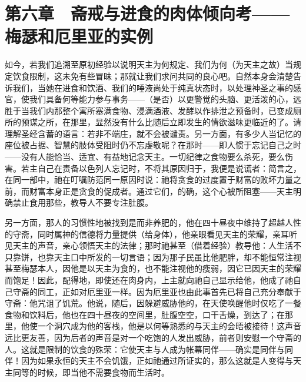 
\section{第六章　斋戒与进食的肉体倾向考——梅瑟和厄里亚的实例}

如今，若我们追溯至原初经验以说明天主为何规定、我们为何（为天主之故）当规定饮食限制，这未免有些冒昧；那就让我们求问共同的良心吧。自然本身会清楚告诉我们，当她在进食和饮酒、我们的唾液尚处于纯真状态时，以处理神圣之事的感官，使我们具备何等能力参与事务——（是否）以更警觉的头脑、更活泼的心，远胜于当我们内那整个寓所塞满食物、浸满酒液、发酵以作排泄之预备时，已变成厕所的预谋之所，在那里，显然没有什么比随后立即发生的情欲滋味更临近的了。请理解圣经含蓄的语言：若非不端庄，就不会被谴责。另一方面，有多少人当记忆的座位被占据、智慧的肢体受阻时仍不忘虔敬呢？在那时——即人惯于忘记自己之时——没有人能恰当、适宜、有益地记念天主。一切纪律之食物要么杀死，要么伤害。若主自己在责备以色列人忘记时，不将其原因归于，我便是说谎者：简言之，在同一部中，祂在叮嘱防范同一原因时说：祂将贪食的过度置于财富的败坏力量之前，而财富本身正是贪食的促成者。通过它们，的确，这个心被所阻塞——天主明确禁止食用那些，教导人不要专注肚腹。\par

另一方面，那人的习惯性地被找到是而非养肥的，他在四十昼夜中维持了超越人性的守斋，同时属神的信德将力量提供（给身体），他亲眼看见天主的荣耀，亲耳听见天主的声音，亲心领悟天主的法律；那时祂甚至（借着经验）教导他：人生活不只靠饼，也靠天主口中所发的一切言语；因为那子民虽比他肥胖，却不能恒常注视甚至梅瑟本人，因他是以天主为食的，也不能注视他的瘦弱，因它已因天主的荣耀而饱足！因此，配得地，即使还在肉身内，上主就向祂自己显示给他，他成了祂自己守斋的同工，正如对厄里亚一样。因为厄里亚也由此事首先已将自己充分奉献于守斋：他咒诅了饥荒。他说，随后，因躲避威胁他的，在天使唤醒他时仅吃了一餐食物和饮料后，他也在四十昼夜的空间里，肚腹空空，口干舌燥，到达了；在那里，他使一个洞穴成为他的客栈，他是以何等熟悉的与天主的会晤被接待！这声音远比更友善，因为后者的声音是对一个吃饱的人发出威胁，前者则安慰一个守斋的人。这就是限制的饮食的殊荣：它使天主与人成为帐幕同伴——确实是同伴与同伴！因为如果永恒的天主不会饥饿，正如祂通过所证实的，那么这就是人变得与天主同等的时候，即当他不需要食物而生活时。\par


